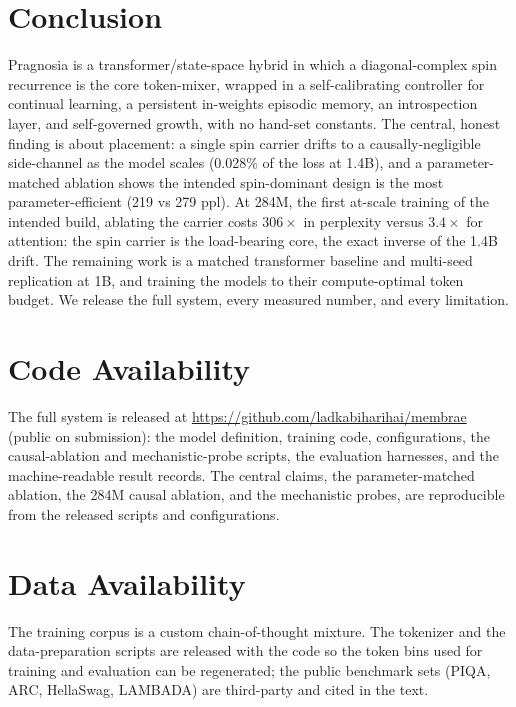 \documentclass[10pt,twocolumn]{article}
\begin{document}
\section{Conclusion}
Pragnosia is a transformer/state-space hybrid in which a diagonal-complex spin recurrence is the core token-mixer, wrapped in a self-calibrating controller for continual learning, a persistent in-weights episodic memory, an introspection layer, and self-governed growth, with no hand-set constants. The central, honest finding is about placement: a single spin carrier drifts to a causally-negligible side-channel as the model scales (0.028\% of the loss at 1.4B), and a parameter-matched ablation shows the intended spin-dominant design is the most parameter-efficient (219 vs 279 ppl). At 284M, the first at-scale training of the intended build, ablating the carrier costs $306\times$ in perplexity versus $3.4\times$ for attention: the spin carrier is the load-bearing core, the exact inverse of the 1.4B drift. The remaining work is a matched transformer baseline and multi-seed replication at 1B, and training the models to their compute-optimal token budget. We release the full system, every measured number, and every limitation.

\section*{Code Availability}
The full system is released at \url{https://github.com/ladkabiharihai/membrae} (public on submission): the model definition, training code, configurations, the causal-ablation and mechanistic-probe scripts, the evaluation harnesses, and the machine-readable result records. The central claims, the parameter-matched ablation, the 284M causal ablation, and the mechanistic probes, are reproducible from the released scripts and configurations.

\section*{Data Availability}
The training corpus is a custom chain-of-thought mixture. The tokenizer and the data-preparation scripts are released with the code so the token bins used for training and evaluation can be regenerated; the public benchmark sets (PIQA, ARC, HellaSwag, LAMBADA) are third-party and cited in the text.



\end{document}
